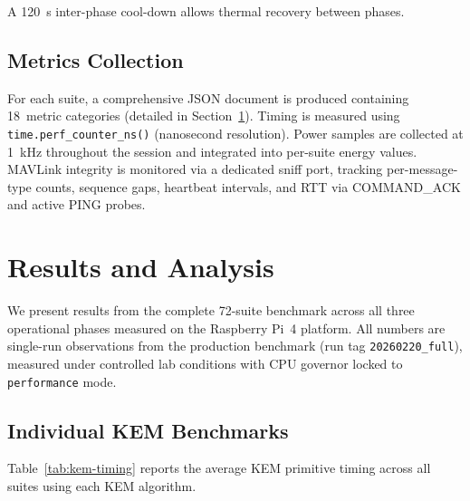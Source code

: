 \documentclass[conference]{IEEEtran}
\begin{document}
A \SI{120}{\second} inter-phase cool-down allows thermal recovery between phases.

\subsection{Metrics Collection}

For each suite, a comprehensive JSON document is produced containing 18~metric categories (detailed in Section~\ref{sec:results}).
Timing is measured using \texttt{time.perf\_counter\_ns()} (nanosecond resolution).
Power samples are collected at \SI{1}{\kilo\hertz} throughout the session and integrated into per-suite energy values.
MAVLink integrity is monitored via a dedicated sniff port, tracking per-message-type counts, sequence gaps, heartbeat intervals, and RTT via COMMAND\_ACK and active PING probes.

\section{Results and Analysis}
\label{sec:results}

We present results from the complete 72-suite benchmark across all three operational phases measured on the Raspberry Pi~4 platform.
All numbers are single-run observations from the production benchmark (run tag \texttt{20260220\_full}), measured under controlled lab conditions with CPU governor locked to \texttt{performance} mode.

\subsection{Individual KEM Benchmarks}

Table~\ref{tab:kem-timing} reports the average KEM primitive timing across all suites using each KEM algorithm.
\end{document}
